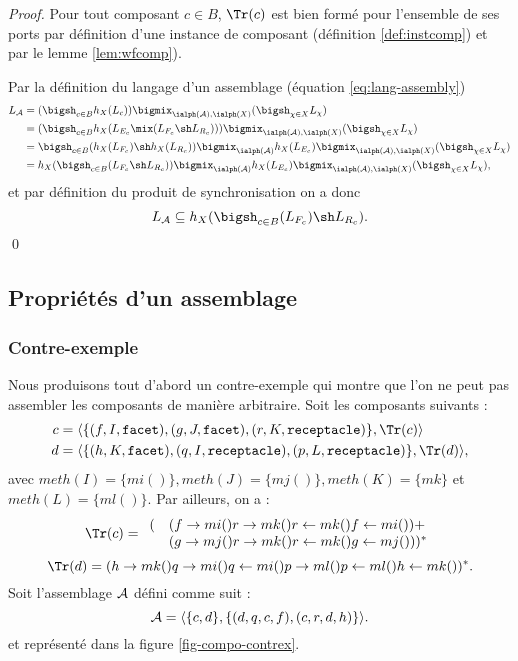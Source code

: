 \begin{proof}
    Pour tout composant $c\in B$, $\Tr(c)$ est bien form\'e pour
    l'ensemble de ses ports par d\'efinition d'une instance de
    composant (d\'efinition \ref{def:instcomp}) et par le lemme
    \ref{lem:wfcomp}). 

Par  la d\'efinition du langage d'un assemblage (\'equation \ref{eq:lang-assembly})
\begin{align*}
    L_{\cal A} &= (\bigsh_{c\in B} h_X(L_c))\bigmix_{\ialph({\cal
        A}),\ialph(X)} (\bigsh_{\chi \in X} L_\chi) \\
   &= (\bigsh_{c\in B} h_X(L_{E_c}\mix (L_{F_c}\sh L_{R_c})))\bigmix_{\ialph({\cal
        A}),\ialph(X)} (\bigsh_{\chi \in X} L_\chi) \\
 &= \bigsh_{c\in B} (h_X(L_{F_c})\sh h_X(L_{R_c}))
        \bigmix_{\ialph({\cal
        A})} h_X(L_{E_c}) \bigmix_{\ialph({\cal
        A}),\ialph(X)} (\bigsh_{\chi \in X} L_\chi) \\
 &= h_X(\bigsh_{c\in B} (L_{F_c}\sh L_{R_c}))
        \bigmix_{\ialph({\cal
        A})} h_X(L_{E_c}) \bigmix_{\ialph({\cal
        A}),\ialph(X)} (\bigsh_{\chi \in X} L_\chi),
\end{align*}
et par d\'efinition du produit de synchronisation on a donc 
$$
L_{\cal A} \subseteq h_X(\bigsh_{c\in B} (L_{F_c}) \sh L_{R_c}).
$$
\hfill\qed
\end{proof}

\subsection{Propri\'et\'es d'un assemblage}

\subsubsection{Contre-exemple}

Nous produisons tout d'abord un contre-exemple qui montre que l'on ne
peut pas assembler les composants de mani\`ere arbitraire. 
Soit les composants suivants :
\begin{align*}
c&=\langle\{(f,I,\mathtt{facet}),(g,J,\mathtt{facet}),(r,K,\mathtt{receptacle})\},\Tr(c)\rangle
\\  d&=\langle
\{(h,K,\mathtt{facet}),(q,I,\mathtt{receptacle}),(p,L,\mathtt{receptacle})\},\Tr(d)\rangle,    
\end{align*}
avec $meth(I)=\{mi()\}, meth(J)=\{mj()\}, meth(K)=\{mk\}$ et
$meth(L)=\{ml()\}$. Par ailleurs, on a :
$$
\Tr(c)= 
\begin{array}{ll}
(&(f\rightarrow mi() r\rightarrow mk() r\leftarrow mk() f\leftarrow mi()) +\\
&(g\rightarrow mj() r\rightarrow mk() r\leftarrow mk() g\leftarrow mj()))^*
\end{array}
$$
$$
\Tr(d)= 
(h\rightarrow mk() q\rightarrow mi() q\leftarrow mi() p\rightarrow
ml() p\leftarrow ml() h\leftarrow mk())^*. 
$$
Soit l'assemblage $\cal A$ d\'efini comme suit :
$$
{\cal A}=\langle \{c,d\},\{(d,q,c,f),(c,r,d,h)\} \rangle.
$$
et repr\'esent\'e dans la figure \ref{fig-compo-contrex}.

